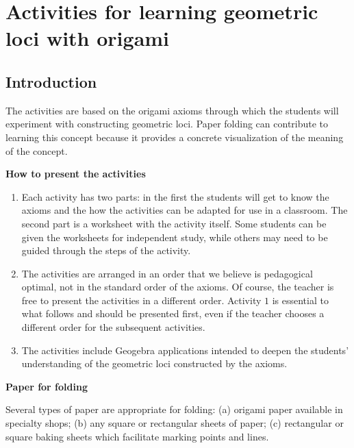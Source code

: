 

\section{Activities for learning geometric loci with origami}

\subsection{Introduction}

The activities are based on the origami axioms through which the students will experiment with constructing geometric loci. Paper folding can contribute to learning this concept because it provides a concrete visualization of the meaning of the concept.

\textbf{How to present the activities}

\begin{enumerate}

\item Each activity has two parts: in the first the students will get to know the axioms and the how the activities can be adapted for use in a classroom. The second part is a worksheet with the activity itself. Some students can be given the worksheets for independent study, while others may need to be guided through the steps of the activity.

\item The activities are arranged in an order that we believe is pedagogical optimal, not in the standard order of the axioms. Of course, the teacher is free to present the activities in a different order. Activity $1$ is essential to what follows and should be presented first, even if the teacher chooses a different order for the subsequent activities.

\item The activities include Geogebra applications intended to deepen the students' understanding of the geometric loci constructed by the axioms.
\end{enumerate}

\textbf{Paper for folding}

Several types of paper are appropriate for folding: (a) origami paper available in specialty shops; (b) any square or rectangular sheets of paper; (c) rectangular or square baking sheets which facilitate marking points and lines.

